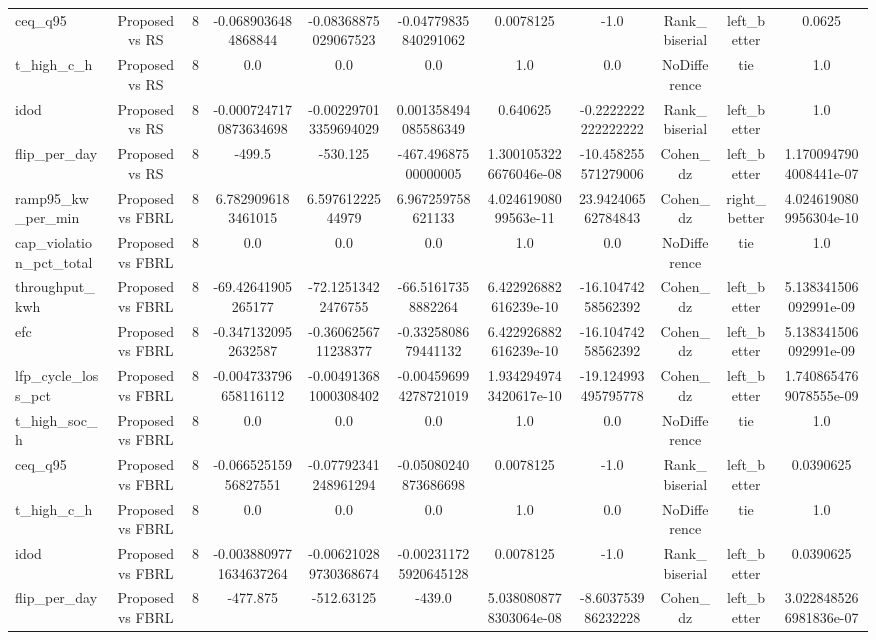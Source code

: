 \begin{table}[t]
\begin{tabular}{lcccccccccc}
ceq\_q95 & Proposed vs RS & 8 & -0.0689036484868844 & -0.08368875029067523 & -0.04779835840291062 & 0.0078125 & -1.0 & Rank\_biserial & left\_better & 0.0625 \\
t\_high\_c\_h & Proposed vs RS & 8 & 0.0 & 0.0 & 0.0 & 1.0 & 0.0 & NoDifference & tie & 1.0 \\
idod & Proposed vs RS & 8 & -0.0007247170873634698 & -0.002297013359694029 & 0.001358494085586349 & 0.640625 & -0.2222222222222222 & Rank\_biserial & left\_better & 1.0 \\
flip\_per\_day & Proposed vs RS & 8 & -499.5 & -530.125 & -467.49687500000005 & 1.3001053226676046e-08 & -10.458255571279006 & Cohen\_dz & left\_better & 1.1700947904008441e-07 \\
ramp95\_kw\_per\_min & Proposed vs FBRL & 8 & 6.7829096183461015 & 6.59761222544979 & 6.967259758621133 & 4.02461908099563e-11 & 23.942406562784843 & Cohen\_dz & right\_better & 4.0246190809956304e-10 \\
cap\_violation\_pct\_total & Proposed vs FBRL & 8 & 0.0 & 0.0 & 0.0 & 1.0 & 0.0 & NoDifference & tie & 1.0 \\
throughput\_kwh & Proposed vs FBRL & 8 & -69.42641905265177 & -72.12513422476755 & -66.51617358882264 & 6.422926882616239e-10 & -16.10474258562392 & Cohen\_dz & left\_better & 5.138341506092991e-09 \\
efc & Proposed vs FBRL & 8 & -0.3471320952632587 & -0.3606256711238377 & -0.3325808679441132 & 6.422926882616239e-10 & -16.10474258562392 & Cohen\_dz & left\_better & 5.138341506092991e-09 \\
lfp\_cycle\_loss\_pct & Proposed vs FBRL & 8 & -0.004733796658116112 & -0.004913681000308402 & -0.004596994278721019 & 1.9342949743420617e-10 & -19.124993495795778 & Cohen\_dz & left\_better & 1.7408654769078555e-09 \\
t\_high\_soc\_h & Proposed vs FBRL & 8 & 0.0 & 0.0 & 0.0 & 1.0 & 0.0 & NoDifference & tie & 1.0 \\
ceq\_q95 & Proposed vs FBRL & 8 & -0.06652515956827551 & -0.07792341248961294 & -0.05080240873686698 & 0.0078125 & -1.0 & Rank\_biserial & left\_better & 0.0390625 \\
t\_high\_c\_h & Proposed vs FBRL & 8 & 0.0 & 0.0 & 0.0 & 1.0 & 0.0 & NoDifference & tie & 1.0 \\
idod & Proposed vs FBRL & 8 & -0.0038809771634637264 & -0.006210289730368674 & -0.002311725920645128 & 0.0078125 & -1.0 & Rank\_biserial & left\_better & 0.0390625 \\
flip\_per\_day & Proposed vs FBRL & 8 & -477.875 & -512.63125 & -439.0 & 5.0380808778303064e-08 & -8.603753986232228 & Cohen\_dz & left\_better & 3.0228485266981836e-07 \\

\end{tabular}
\end{table}
